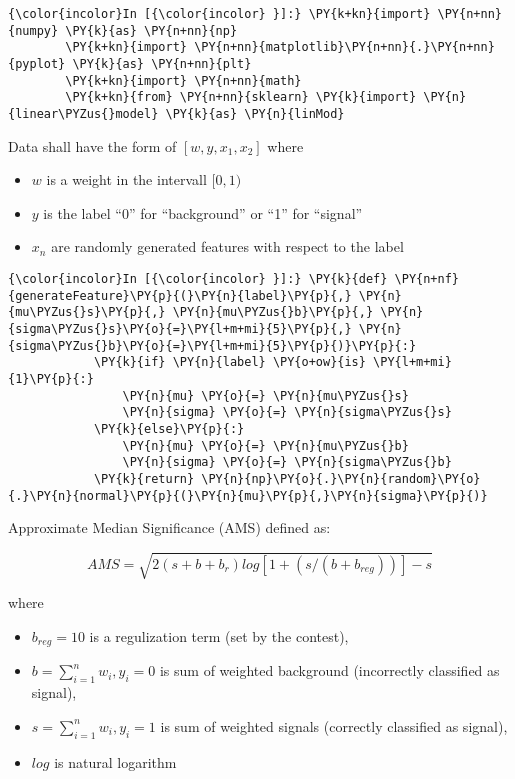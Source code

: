 \begin{Verbatim}[commandchars=\\\{\}]
{\color{incolor}In [{\color{incolor} }]:} \PY{k+kn}{import} \PY{n+nn}{numpy} \PY{k}{as} \PY{n+nn}{np}
        \PY{k+kn}{import} \PY{n+nn}{matplotlib}\PY{n+nn}{.}\PY{n+nn}{pyplot} \PY{k}{as} \PY{n+nn}{plt}
        \PY{k+kn}{import} \PY{n+nn}{math}
        \PY{k+kn}{from} \PY{n+nn}{sklearn} \PY{k}{import} \PY{n}{linear\PYZus{}model} \PY{k}{as} \PY{n}{linMod}
\end{Verbatim}

    Data shall have the form of \([w,y,x_1,x_2]\) where

\begin{itemize}
\tightlist
\item
  \(w\) is a weight in the intervall \([0,1)\)
\item
  \(y\) is the label ``0'' for ``background'' or ``1'' for ``signal''
\item
  \(x_n\) are randomly generated features with respect to the label
\end{itemize}

    \begin{Verbatim}[commandchars=\\\{\}]
{\color{incolor}In [{\color{incolor} }]:} \PY{k}{def} \PY{n+nf}{generateFeature}\PY{p}{(}\PY{n}{label}\PY{p}{,} \PY{n}{mu\PYZus{}s}\PY{p}{,} \PY{n}{mu\PYZus{}b}\PY{p}{,} \PY{n}{sigma\PYZus{}s}\PY{o}{=}\PY{l+m+mi}{5}\PY{p}{,} \PY{n}{sigma\PYZus{}b}\PY{o}{=}\PY{l+m+mi}{5}\PY{p}{)}\PY{p}{:}
            \PY{k}{if} \PY{n}{label} \PY{o+ow}{is} \PY{l+m+mi}{1}\PY{p}{:}
                \PY{n}{mu} \PY{o}{=} \PY{n}{mu\PYZus{}s}
                \PY{n}{sigma} \PY{o}{=} \PY{n}{sigma\PYZus{}s}
            \PY{k}{else}\PY{p}{:}
                \PY{n}{mu} \PY{o}{=} \PY{n}{mu\PYZus{}b}
                \PY{n}{sigma} \PY{o}{=} \PY{n}{sigma\PYZus{}b}
            \PY{k}{return} \PY{n}{np}\PY{o}{.}\PY{n}{random}\PY{o}{.}\PY{n}{normal}\PY{p}{(}\PY{n}{mu}\PY{p}{,}\PY{n}{sigma}\PY{p}{)}
\end{Verbatim}

    Approximate Median Significance (AMS) defined as:

\[AMS = \sqrt{2 { (s + b + b_r) log[1 + (s/(b+b_{reg}))] - s}}\]

where

\begin{itemize}
\tightlist
\item
  \(b_{reg} = 10\) is a regulization term (set by the contest),
\item
  \(b = \sum_{i=1}^{n} w_i, y_i=0\) is sum of weighted background
  (incorrectly classified as signal),
\item
  \(s = \sum_{i=1}^{n} w_i, y_i=1\) is sum of weighted signals
  (correctly classified as signal),
\item
  \(log\) is natural logarithm
\end{itemize}

